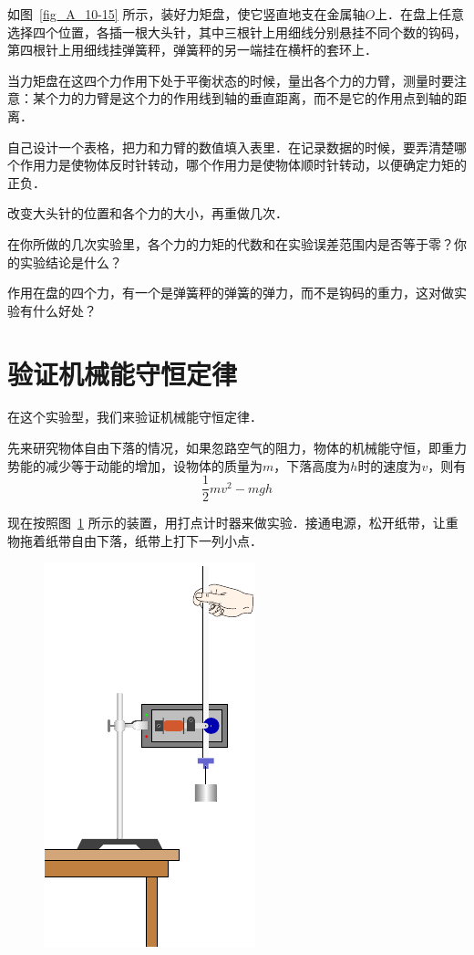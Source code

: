 如图~\ref{fig_A_10-15} 所示，装好力矩盘，使它竖直地支在金属轴$O$上．在盘上任意选择四个位置，各插一根大头针，其中三根针上用细线分别悬挂不同个数的钩码，第四根针上用细线挂弹簧秤，弹簧秤的另一端挂在横杆的套环上．

当力矩盘在这四个力作用下处于平衡状态的时候，量出各个力的力臂，测量时要注意：某个力的力臂是这个力的作用线到轴的垂直距离，而不是它的作用点到轴的距离．

自己设计一个表格，把力和力臂的数值填入表里．在记录数据的时候，要弄清楚哪个作用力是使物体反时针转动，哪个作用力是使物体顺时针转动，以便确定力矩的正负．

改变大头针的位置和各个力的大小，再重做几次．

在你所做的几次实验里，各个力的力矩的代数和在实验误差范围内是否等于零？你的实验结论是什么？

作用在盘的四个力，有一个是弹簧秤的弹簧的弹力，而不是钩码的重力，这对做实验有什么好处？

\section{验证机械能守恒定律}
在这个实验型，我们来验证机械能守恒定律．

先来研究物体自由下落的情况，如果忽路空气的阻力，物体的机械能守恒，即重力势能的减少等于动能的增加，设物体的质量为$m$，下落高度为$h$时的速度为$v$，则有
\[\frac{1}{2}mv^2-mgh\]

现在按照图~\ref{fig_A_10-16} 所示的装置，用打点计时器来做实验．接通电源，松开纸带，让重物拖着纸带自由下落，纸带上打下一列小点．
\begin{figure}[htbp]
    \centering
    \includegraphics{fig/A/10-16.pdf}
    \caption{}\label{fig_A_10-16}
\end{figure}

